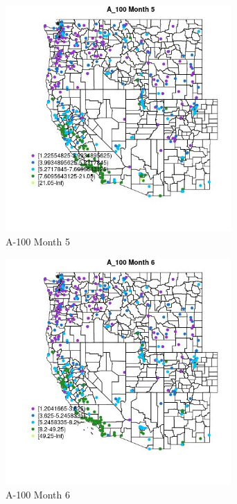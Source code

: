 \begin{figure} 
\centering  
\includegraphics[width=0.77\textwidth]{Code_Outputs/ML_input_report_ML_input_PM25_Step5_part_d_de_duplicated_aves_ML_input_MapObsMo5A_100.jpg} 
\caption{\label{fig:ML_input_report_ML_input_PM25_Step5_part_d_de_duplicated_aves_ML_inputMapObsMo5A_100}A-100 Month 5} 
\end{figure} 
 

\begin{figure} 
\centering  
\includegraphics[width=0.77\textwidth]{Code_Outputs/ML_input_report_ML_input_PM25_Step5_part_d_de_duplicated_aves_ML_input_MapObsMo6A_100.jpg} 
\caption{\label{fig:ML_input_report_ML_input_PM25_Step5_part_d_de_duplicated_aves_ML_inputMapObsMo6A_100}A-100 Month 6} 
\end{figure} 
 

